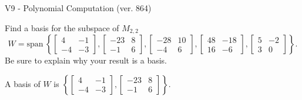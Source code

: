 \begin{exercise}
  \begin{exerciseTitle}V9 - Polynomial Computation (ver. 864)\end{exerciseTitle}
  \begin{exerciseStatement}
    Find a basis for the subspace of \(M_{2,2}\) 
\[W=\mathrm{span}\ \left\{\left[\begin{array}{cc}
4 & -1 \\
-4 & -3
\end{array}\right] , \left[\begin{array}{cc}
-23 & 8 \\
-1 & 6
\end{array}\right] , \left[\begin{array}{cc}
-28 & 10 \\
-4 & 6
\end{array}\right] , \left[\begin{array}{cc}
48 & -18 \\
16 & -6
\end{array}\right] , \left[\begin{array}{cc}
5 & -2 \\
3 & 0
\end{array}\right]\right\}.\]
 Be sure to explain why your result is a basis.


  \end{exerciseStatement}
  \begin{exerciseAnswer}
   A basis of \(W\) is  \(\left\{\left[\begin{array}{cc}
4 & -1 \\
-4 & -3
\end{array}\right] , \left[\begin{array}{cc}
-23 & 8 \\
-1 & 6
\end{array}\right]\right\}\).
  


  \end{exerciseAnswer}
\end{exercise}